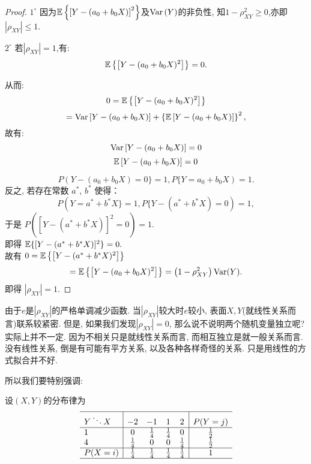 \begin{proof}
    \qquad $1^{\circ}$ 因为$\mathbb E\left\{\left[Y-\left(a_0 + b_0X\right)\right]^2\right\}$及$\operatorname{Var}\left(Y\right)$的非负性, 
     知$1-\rho_{X Y}^2 \geq 0$,亦即$\left| \rho_{X Y} \right| \leq 1.$

     
    \qquad $2^{\circ}$ 若$\left|\rho_{X Y}\right| = 1$,有:
    $$
       \mathbb E\left\{\left[Y - (a_0 + b_0X)^2\right]\right\} = 0.
    $$
    
    从而:
    $$
        0 =\mathbb E\left\{\left[Y - (a_0 + b_0X)^2\right]\right\} 
    $$
    $$
        = \operatorname{Var}\left[Y - (a_0+b_0X)\right] + \left\{\mathbb E\left[Y - \left(a_0+b_0X\right)\right]\right\}^2,
   $$
    故有:
    $$
     \operatorname{Var}\left[Y - (a_0+b_0X)\right] = 0
    $$
    $$
    \mathbb E\left[Y - \left(a_0+b_0X\right)\right] = 0
    $$

    \[P(Y - (a_0 + b_0X) = 0\} = 1, P\{Y = a_0 + b_0X) = 1.\]
        反之, 若存在常数 $a^*$, $b^*$ 使得：
        \[P(Y = a^* + b^*X\} = 1, P\{Y - (a^* + b^*X) = 0) = 1,\]
        于是 \qquad $P([Y - (a^* + b^*X)]^2 = 0) = 1.$\\
        即得 \qquad $\mathbb E\{[Y - (a^* + b^*X)]^2\} = 0.$\\
        故有 \qquad $0 =\mathbb E\left\{\left[Y - (a^* + b^*X)^2\right]\right\}$
        \[
             =\mathbb E\left\{\left[Y - (a_0 + b_0X)^2\right]\right\} =\left(1-\rho_{X Y}^2\right) \operatorname{Var}(Y)  .
        \]
        即得 \qquad $\left|\rho_{X Y}\right| = 1.$
\end{proof}

由于$e$是$\left|\rho_{X Y}\right|$的严格单调减少函数. 当$\left|\rho_{X Y}\right|$较大时$e$较小, 表面$X,Y$(就线性关系而言)联系较紧密. 但是, 如果我们发现$|\rho_{XY}|=0$, 那么说不说明两个随机变量独立呢? 实际上并不一定. 因为不相关只是就线性关系而言, 而相互独立是就一般关系而言. 没有线性关系, 倒是有可能有平方关系, 以及各种各样奇怪的关系. 只是用线性的方式拟合并不好. 

所以我们要特别强调: 

\begin{center}
\end{center}

\begin{example}
    设$(X,Y)$的分布律为
         $$
                \begin{array}{l|cccc|c}
                    \hline Y \ddots X         & -2            & -1            & 1            & 2            & P(Y=j)     \\
                    \hline 1        &0  & \frac{1}{4}            & \frac{1}{4}            & 0            & \frac{1}{2} \\
                    4               & \frac{1}{4}            & 0 & 0 & \frac{1}{4} & \frac{1}{2} \\
                    \hline P(X=i) & \frac{1}{4} & \frac{1}{4} & \frac{1}{4} & \frac{1}{4} & 1            \\
                    \hline
                \end{array}
            $$
\end{example}

